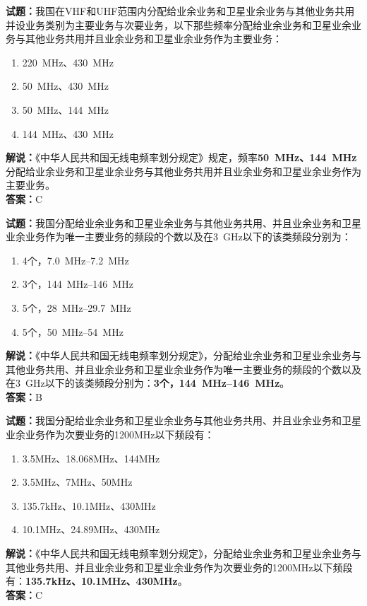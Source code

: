 \documentclass{ctexbook}
\begin{document}
\bigskip

\noindent\textbf{试题：}我国在VHF和UHF范围内分配给业余业务和卫星业余业务与其他业务共用并设业务类别为主要业务与次要业务，以下那些频率分配给业余业务和卫星业余业务与其他业务共用并且业余业务和卫星业余业务作为主要业务：
\begin{enumerate}[leftmargin=3em]
  \item \qty{220}{\MHz}、\qty{430}{\MHz}
  \item \qty{50}{\MHz}、\qty{430}{\MHz}
  \item \qty{50}{\MHz}、\qty{144}{\MHz}
  \item \qty{144}{\MHz}、\qty{430}{\MHz}
\end{enumerate}
\noindent\textbf{解说：}《中华人民共和国无线电频率划分规定》规定，频率\textbf{\qty{50}{\MHz}、\qty{144}{\MHz}}分配给业余业务和卫星业余业务与其他业务共用并且业余业务和卫星业余业务作为主要业务。\\\noindent\textbf{答案：}C

\bigskip

\noindent\textbf{试题：}我国分配给业余业务和卫星业余业务与其他业务共用、并且业余业务和卫星业余业务作为唯一主要业务的频段的个数以及在\qty{3}{\GHz}以下的该类频段分别为：
\begin{enumerate}[leftmargin=3em]
  \item 4个，\qtyrange[range-phrase=--]{7.0}{7.2}{\MHz}
  \item 3个，\qtyrange[range-phrase=--]{144}{146}{\MHz}
  \item 5个，\qtyrange[range-phrase=--]{28}{29.7}{\MHz}
  \item 5个，\qtyrange[range-phrase=--]{50}{54}{\MHz}
\end{enumerate}
\noindent\textbf{解说：}《中华人民共和国无线电频率划分规定》，分配给业余业务和卫星业余业务与其他业务共用、并且业余业务和卫星业余业务作为唯一主要业务的频段的个数以及在\qty{3}{\GHz}以下的该类频段分别为：\textbf{3个，\qtyrange[range-phrase=--]{144}{146}{\MHz}}。\\\noindent\textbf{答案：}B

\bigskip

\noindent\textbf{试题：}我国分配给业余业务和卫星业余业务与其他业务共用、并且业余业务和卫星业余业务作为次要业务的1200\si{\MHz}以下频段有：
\begin{enumerate}[leftmargin=3em]
  \item 3.5\si{\MHz}、18.068\si{\MHz}、144\si{\MHz}
  \item 3.5\si{\MHz}、7\si{\MHz}、50\si{\MHz}
  \item 135.7\si{\kHz}、10.1\si{\MHz}、430\si{\MHz}
  \item 10.1\si{\MHz}、24.89\si{\MHz}、430\si{\MHz}
\end{enumerate}
\noindent\textbf{解说：}《中华人民共和国无线电频率划分规定》，分配给业余业务和卫星业余业务与其他业务共用、并且业余业务和卫星业余业务作为次要业务的1200\si{\MHz}以下频段有：\textbf{135.7\si{\kHz}、10.1\si{\MHz}、430\si{\MHz}}。\\\noindent\textbf{答案：}C
\end{document}
